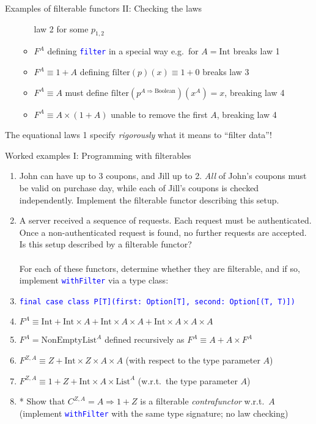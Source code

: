 \documentclass[english]{beamer}
\begin{document}
\begin{frame}{Examples of filterable functors II: Checking the laws}
\begin{itemize}
\begin{itemize}
law 2 for some $p_{1,2}$
\item $F^{A}$ defining \texttt{\textcolor{blue}{\footnotesize{}filter}}
in a special way e.g.~for $A=\text{Int}$ \textendash{} breaks law
1
\item $F^{A}\equiv1+A$ defining $\text{filter}\left(p\right)\left(x\right)\equiv1+0$
breaks law 3
\item $F^{A}\equiv A$ \textendash{} must define $\text{filter}\left(p^{A\Rightarrow\text{Boolean}}\right)\left(x^{A}\right)=x$,
breaking law 4
\item $F^{A}\equiv A\times\left(1+A\right)$ \textendash{} unable to remove
the first $A$, breaking law 4
\end{itemize}
\end{itemize}
The equational laws 1 specify \emph{rigorously} what
it means to ``filter data''!
\end{frame}

\begin{frame}{Worked examples I: Programming with filterables}
\begin{enumerate}
\item John can have up to 3 coupons, and Jill up to 2. \emph{All} of John's
coupons must be valid on purchase day, while each of Jill's coupons
is checked independently. Implement the filterable functor describing
this setup.
\item A server received a sequence of requests. Each request must be authenticated.
Once a non-authenticated request is found, no further requests are
accepted. Is this setup described by a filterable functor?\\
\ \\
For each of these functors, determine whether they are filterable,
and if so, implement \texttt{\textcolor{blue}{\footnotesize{}withFilter}}
via a type class:
\item \texttt{\textcolor{blue}{\footnotesize{}final case class P{[}T{]}(first:\ Option{[}T{]},
second:\ Option{[}(T, T){]})}}{\footnotesize \par}
\item $F^{A}\equiv\text{Int}+\text{Int}\times A+\text{Int}\times A\times A+\text{Int}\times A\times A\times A$
\item $F^{A}=\text{NonEmptyList}^{A}$ defined recursively as $F^{A}\equiv A+A\times F^{A}$ 
\item $F^{Z,A}\equiv Z+\text{Int}\times Z\times A\times A$ (with respect
to the type parameter $A$)
\item $F^{Z,A}\equiv1+Z+\text{Int}\times A\times\text{List}^{A}$ (w.r.t.\ the
type parameter $A$)
\item {*} Show that $C^{Z,A}=A\Rightarrow1+Z$ is a filterable \emph{contrafunctor}
w.r.t.\ $A$ (implement \texttt{\textcolor{blue}{\footnotesize{}withFilter}}
with the same type signature; no law checking)
\end{enumerate}
\end{frame}
\end{document}
